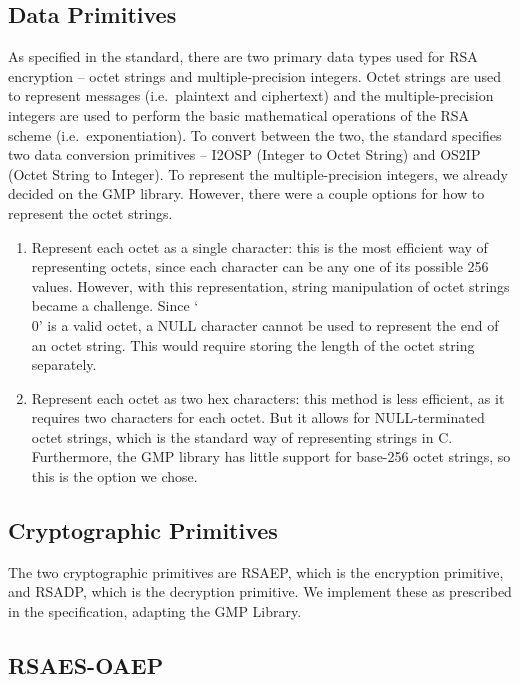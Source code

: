 \documentclass[a4paper]{article}
\begin{document}
\subsection{Data Primitives}
As specified in the standard, there are two primary data types used for RSA encryption – octet strings and multiple-precision integers. Octet strings are used to represent messages (i.e.\ plaintext and ciphertext) and the multiple-precision integers are used to perform the basic mathematical operations of the RSA scheme (i.e.\ exponentiation). To convert between the two, the standard specifies two data conversion primitives – I2OSP (Integer to Octet String) and OS2IP (Octet String to Integer). To represent the multiple-precision integers, we already decided on the GMP library. However, there were a couple options for how to represent the octet strings.

\begin{enumerate}
    \item Represent each octet as a single character: this is the most efficient way of representing octets, since each character can be any one of its possible 256 values. However, with this representation, string manipulation of octet strings became a challenge. Since ‘\\0' is a valid octet, a NULL character cannot be used to represent the end of an octet string. This would require storing the length of the octet string separately. 

    \item Represent each octet as two hex characters: this method is less efficient, as it requires two characters for each octet. But it allows for NULL-terminated octet strings, which is the standard way of representing strings in C. Furthermore, the GMP library has little support for base-256 octet strings, so this is the option we chose.
\end{enumerate}

\subsection{Cryptographic Primitives}

The two cryptographic primitives are RSAEP, which is the encryption primitive, and RSADP, which is the decryption primitive. We implement these as prescribed in the specification, adapting the GMP Library. 

\subsection{RSAES-OAEP}
\end{document}

